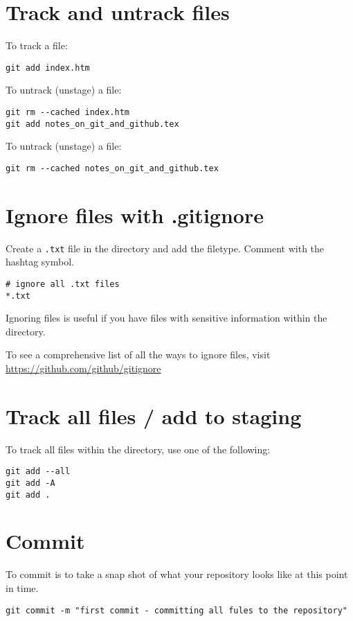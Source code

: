 \documentclass[12pt]{article}
\begin{document}
\section{Track and untrack files}
To track a file:
\begin{Verbatim}
git add index.htm
\end{Verbatim}
To untrack (unstage) a file:
\begin{Verbatim}
git rm --cached index.htm
git add notes_on_git_and_github.tex
\end{Verbatim}
To untrack (unstage) a file:
\begin{Verbatim}
git rm --cached notes_on_git_and_github.tex
\end{Verbatim}


\section{Ignore files with {\ttfamily .gitignore}}
Create a \verb|.txt| file in the directory and add the filetype. Comment with the hashtag symbol.
\begin{Verbatim}[frame=single]
# ignore all .txt files
*.txt
\end{Verbatim}
Ignoring files is useful if you have files with sensitive information within the directory.\par
To see a comprehensive list of all the ways to ignore files, visit \href{https://github.com/github/gitignore}{https://github.com/github/gitignore}

\section{Track all files / add to staging}
To track all files within the directory, use one of the following:
\begin{Verbatim}
git add --all
git add -A
git add .
\end{Verbatim}


\section{Commit}
To commit is to take a snap shot of what your repository looks like at this point in time.
\begin{Verbatim}
git commit -m "first commit - committing all fules to the repository"
\end{Verbatim}
\end{document}
